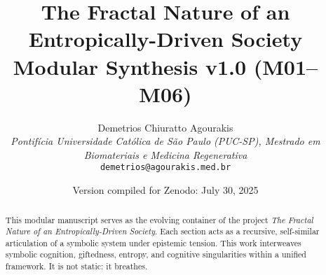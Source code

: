 \documentclass[12pt]{article}
\title{\textbf{The Fractal Nature of an Entropically-Driven Society} \\ \large Modular Synthesis v1.0 (M01–M06)}
\author{
Demetrios Chiuratto Agourakis\\
\textit{Pontifícia Universidade Católica de São Paulo (PUC-SP), Mestrado em Biomateriais e Medicina Regenerativa}\\
\texttt{demetrios@agourakis.med.br}
}
\date{Version compiled for Zenodo: July 30, 2025}
\begin{document}
\maketitle


\begin{abstract}
This modular manuscript serves as the evolving container of the project \textit{The Fractal Nature of an Entropically-Driven Society}. Each section acts as a recursive, self-similar articulation of a symbolic system under epistemic tension. This work interweaves symbolic cognition, giftedness, entropy, and cognitive singularities within a unified framework. It is not static: it breathes.
\end{abstract}

\tableofcontents
\newpage







% 
% 
% 
% 




\end{document}
